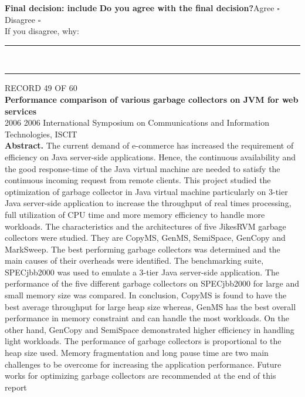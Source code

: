 \documentclass[11pt,a4paper]{article}
\begin{document}
{\small\textbf{Final decision: include}}
\vspace{2mm}
{\small\textbf{Do you agree with the final decision?}\quad{}Agree $\square$\qquad{}Disagree $\square$}\\[1mm]
{\footnotesize\color{soft}If you disagree, why:}\\[1mm]
\color{rule}\rule{\linewidth}{0.3pt}\\[3mm]\rule{\linewidth}{0.3pt}\color{black}
\clearpage
{\color{soft}\footnotesize RECORD 49 OF 60}\\[1mm]
{\large\bfseries Performance comparison of various garbage collectors on JVM for web services}\\[1.5mm]
{\color{soft}\small 2006 \textperiodcentered{} 2006 International Symposium on Communications and Information Technologies, ISCIT}\\[2mm]
{\small\textbf{Abstract.} The current demand of e-commerce has increased the requirement of efficiency on Java server-side applications. Hence, the continuous availability and the good response-time of the Java virtual machine are needed to satisfy the continuous incoming request from remote clients. This project studied the optimization of garbage collector in Java virtual machine particularly on 3-tier Java server-side application to increase the throughput of real times processing, full utilization of CPU time and more memory efficiency to handle more workloads. The characteristics and the architectures of five JikesRVM garbage collectors were studied. They are CopyMS, GenMS, SemiSpace, GenCopy and MarkSweep. The best performing garbage collectors was determined and the main causes of their overheads were identified. The benchmarking suite, SPECjbb2000 was used to emulate a 3-tier Java server-side application. The performance of the five different garbage collectors on SPECjbb2000 for large and small memory size was compared. In conclusion, CopyMS is found to have the best average throughput for large heap size whereas, GenMS has the best overall performance in memory constraint and can handle the most workloads. On the other hand, GenCopy and SemiSpace demonstrated higher efficiency in handling light workloads. The performance of garbage collectors is proportional to the heap size used. Memory fragmentation and long pause time are two main challenges to be overcome for increasing the application performance. Future works for optimizing garbage collectors are recommended at the end of this report}
\end{document}
